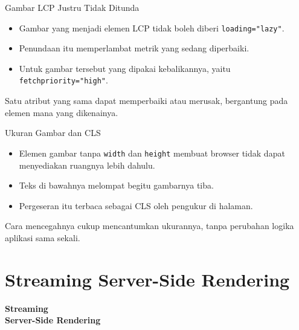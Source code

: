 \documentclass[aspectratio=169, table, 12pt]{beamer}
\begin{document}
\begin{frame}{{\Large Gambar LCP Justru Tidak Ditunda}}
  \vspace{14pt}
  \begin{itemize}
    \item Gambar yang menjadi elemen LCP tidak boleh diberi
          \texttt{loading="lazy"}.
    \item Penundaan itu memperlambat metrik yang sedang diperbaiki.
    \item Untuk gambar tersebut yang dipakai kebalikannya, yaitu
          \texttt{fetchpriority="high"}.
  \end{itemize}
  \vspace{10pt}
  {\footnotesize Satu atribut yang sama dapat memperbaiki atau merusak,
  bergantung pada elemen mana yang dikenainya.}
\end{frame}

\begin{frame}{{\Large Ukuran Gambar dan CLS}}
  \vspace{14pt}
  \begin{itemize}
    \item Elemen gambar tanpa \texttt{width} dan \texttt{height} membuat
          browser tidak dapat menyediakan ruangnya lebih dahulu.
    \item Teks di bawahnya melompat begitu gambarnya tiba.
    \item Pergeseran itu terbaca sebagai CLS oleh pengukur di halaman.
  \end{itemize}
  \vspace{10pt}
  {\footnotesize Cara mencegahnya cukup mencantumkan ukurannya, tanpa
  perubahan logika aplikasi sama sekali.}
\end{frame}

\section{Streaming Server-Side Rendering}

\begin{frame}{\hfill}
  \centering
  \Huge{\textbf{Streaming\\Server-Side Rendering}}
\end{frame}
\end{document}
